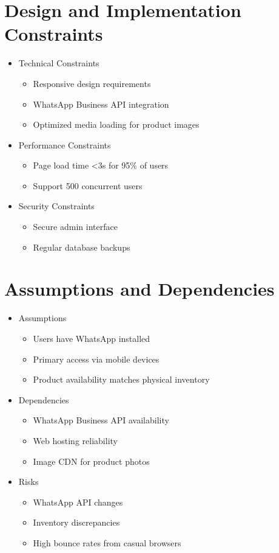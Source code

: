 \documentclass[oneside,a4paper,12pt,explicit]{book}
\begin{document}
\section{Design and Implementation Constraints}
\begin{itemize}
    \item Technical Constraints
    \begin{itemize}
        \item Responsive design requirements
        \item WhatsApp Business API integration
        \item Optimized media loading for product images
    \end{itemize}
    
    \item Performance Constraints
    \begin{itemize}
        \item Page load time <3s for 95\% of users
        \item Support 500 concurrent users
    \end{itemize}
    
    \item Security Constraints
    \begin{itemize}
        \item Secure admin interface
        \item Regular database backups
    \end{itemize}
\end{itemize}

\section{Assumptions and Dependencies}
\begin{itemize}
    \item Assumptions
    \begin{itemize}
        \item Users have WhatsApp installed
        \item Primary access via mobile devices
        \item Product availability matches physical inventory
    \end{itemize}
    
    \item Dependencies
    \begin{itemize}
        \item WhatsApp Business API availability
        \item Web hosting reliability
        \item Image CDN for product photos
    \end{itemize}
    
    \item Risks
    \begin{itemize}
        \item WhatsApp API changes
        \item Inventory discrepancies
        \item High bounce rates from casual browsers
    \end{itemize}
\end{itemize}
\end{document}
